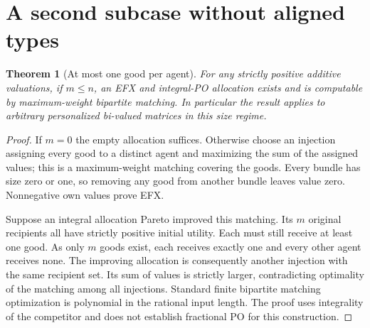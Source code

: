 \documentclass[11pt,a4paper]{article}
\newtheorem{theorem}{Theorem}[section]
\theoremstyle{definition}
\theoremstyle{remark}
\begin{document}
\section{A second subcase without aligned types}
\begin{theorem}[At most one good per agent]
For any strictly positive additive valuations, if $m\le n$, an EFX and integral-PO allocation exists and is computable by maximum-weight bipartite matching. In particular the result applies to arbitrary personalized bi-valued matrices in this size regime.
\end{theorem}
\begin{proof}
If $m=0$ the empty allocation suffices. Otherwise choose an injection assigning every good to a distinct agent and maximizing the sum of the assigned values; this is a maximum-weight matching covering the goods. Every bundle has size zero or one, so removing any good from another bundle leaves value zero. Nonnegative own values prove EFX.

Suppose an integral allocation Pareto improved this matching. Its $m$ original recipients all have strictly positive initial utility. Each must still receive at least one good. As only $m$ goods exist, each receives exactly one and every other agent receives none. The improving allocation is consequently another injection with the same recipient set. Its sum of values is strictly larger, contradicting optimality of the matching among all injections. Standard finite bipartite matching optimization is polynomial in the rational input length. The proof uses integrality of the competitor and does not establish fractional PO for this construction.
\end{proof}
\end{document}

